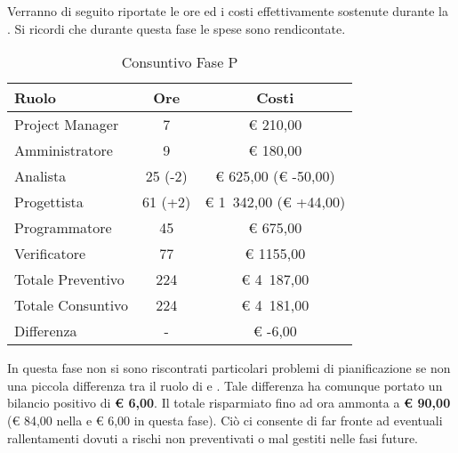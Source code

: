 	Verranno di seguito riportate le ore ed i costi effettivamente sostenute durante la . Si ricordi che durante questa fase le spese sono rendicontate.
	\begin{table}[H]
		\begin{center}
			\begin{tabular}{| l | c | c |}
				\hline
				Ruolo 				& Ore 	& Costi  \\ \hline
				
				Project Manager		& 7 		& \euro{} 210,00 	\\
				Amministratore 		& 9 		& \euro{} 180,00 	\\
				Analista	 		& 25 (-2) 		& \euro{} 625,00 (\euro{} -50,00)	\\
				Progettista 		& 61 (+2)		& \euro{} 1~342,00 (\euro{} +44,00) 	\\
				Programmatore		& 45 		& \euro{} 675,00 	\\
				Verificatore		& 77 		& \euro{} 1155,00 	\\ \hline \hline
				
				Totale Preventivo	& 224 			& \euro{} 4~187,00 	\\ \hline
				Totale Consuntivo	& 224 			& \euro{} 4~181,00 	\\ \hline
				Differenza			& - 			& \euro{} -6,00 	\\ \hline
			\end{tabular}
		\end{center}
		\caption{Consuntivo Fase P}
	\end{table}
			In questa fase non si sono riscontrati particolari problemi di pianificazione se non una piccola differenza tra il ruolo di  e . Tale differenza ha comunque portato un bilancio positivo di \textbf{\euro{} 6,00}.
			Il totale risparmiato fino ad ora ammonta a \textbf{\euro{} 90,00} (\euro{} 84,00 nella  e \euro{} 6,00 in questa fase). Ciò ci consente di far fronte ad eventuali rallentamenti dovuti a rischi non preventivati o mal gestiti nelle fasi future.
	

						

